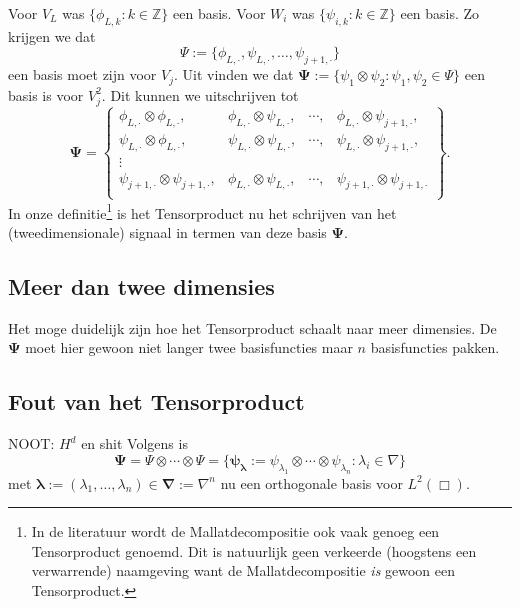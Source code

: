 \documentclass[11pt]{report}
\newcommand{\Z}{\mathbb{Z}}
\theoremstyle{plain}
\theoremstyle{remark}
\begin{document}
Voor $V_L$ was $\{ \phi_{L,k}: k \in \Z \}$ een basis. Voor $W_i$ was $\{ \psi_{i,k}: k \in \Z \}$ een basis. Zo krijgen we dat
\[
	\Psi := \{ \phi_{L,\cdot}, \psi_{L,\cdot}, \ldots, \psi_{j+1,\cdot} \}
\]
een basis moet zijn voor $V_j$. Uit \cite[T8.5]{tensor_wavelet} vinden we dat $\boldsymbol\Psi := \{ \psi_1 \otimes \psi_2: \psi_1, \psi_2 \in \Psi \}$ een basis is voor $V_j^2$. Dit kunnen we uitschrijven tot
\[
  \boldsymbol\Psi = \left\{
  \begin{array}{cccc}
    \phi_{L, \cdot} \otimes \phi_{L, \cdot}, & \phi_{L, \cdot} \otimes \psi_{L, \cdot}, & \cdots, & \phi_{L, \cdot} \otimes \psi_{j+1,\cdot}, \\
    \psi_{L, \cdot} \otimes \phi_{L, \cdot}, & \psi_{L, \cdot} \otimes \psi_{L, \cdot}, & \cdots, & \psi_{L, \cdot} \otimes \psi_{j+1,\cdot} ,\\
    \vdots \\
    \psi_{j+1, \cdot} \otimes \psi_{j+1, \cdot}, & \phi_{L, \cdot} \otimes \psi_{L, \cdot}, & \cdots, & \psi_{j+1, \cdot} \otimes \psi_{j+1,\cdot} \\
  \end{array}\right\}.
\]
In onze definitie\footnote{In de literatuur wordt de Mallatdecompositie ook vaak genoeg een Tensorproduct genoemd. Dit is natuurlijk geen verkeerde (hoogstens een verwarrende) naamgeving want de Mallatdecompositie \emph{is} gewoon een Tensorproduct.} is het Tensorproduct nu het schrijven van het (tweedimensionale) signaal in termen van deze basis $\boldsymbol\Psi$. 

\subsection{Meer dan twee dimensies}
Het moge duidelijk zijn hoe het Tensorproduct schaalt naar meer dimensies. De $\boldsymbol\Psi$ moet hier gewoon niet langer twee basisfuncties maar $n$ basisfuncties pakken. 

\subsection{Fout van het Tensorproduct}
NOOT: $H^d$ en shit
Volgens \cite[L3.1.7]{tammo} is 
\[ 
  \boldsymbol\Psi = \Psi \otimes \cdots \otimes \Psi = \{ \boldsymbol{\psi_\lambda} := \psi_{\lambda_1} \otimes \cdots \otimes \psi_{\lambda_n}: \lambda_i \in \nabla \}
\]
met $\boldsymbol\lambda := (\lambda_1, \ldots, \lambda_n) \in \boldsymbol{\nabla} := \nabla^n$ nu een orthogonale basis voor $L^2(\Box)$.
\end{document}
